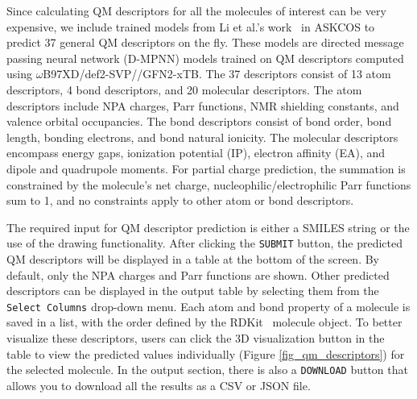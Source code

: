 \documentclass[pdflatex,sn-mathphys-num]{sn-jnl}%
\theoremstyle{thmstyleone}%
\theoremstyle{thmstyletwo}%
\theoremstyle{thmstylethree}%
\begin{document}
Since calculating QM descriptors for all the molecules of interest can be very expensive, we include trained models from Li et al.'s work~\citep{li_when_2024} in ASKCOS to predict 37 general QM descriptors on the fly. These models are directed message passing neural network (D-MPNN) models trained on QM descriptors computed using $\omega$B97XD/def2-SVP//GFN2-xTB. The 37 descriptors consist of 13 atom descriptors, 4 bond descriptors, and 20 molecular descriptors. The atom descriptors include NPA charges, Parr functions, NMR shielding constants, and valence orbital occupancies. The bond descriptors consist of bond order, bond length, bonding electrons, and bond natural ionicity. The molecular descriptors encompass energy gaps, ionization potential (IP), electron affinity (EA), and dipole and quadrupole moments. For partial charge prediction, the summation is constrained by the molecule's net charge, nucleophilic/electrophilic Parr functions sum to 1, and no constraints apply to other atom or bond descriptors.

The required input for QM descriptor prediction is either a SMILES string or the use of the drawing functionality. After clicking the \texttt{SUBMIT} button, the predicted QM descriptors will be displayed in a table at the bottom of the screen. By default, only the NPA charges and Parr functions are shown. Other predicted descriptors can be displayed in the output table by selecting them from the \texttt{Select Columns} drop-down menu. Each atom and bond property of a molecule is saved in a list, with the order defined by the RDKit~\citep{RDKit} molecule object. To better visualize these descriptors, users can click the 3D visualization button in the table to view the predicted values individually (Figure \ref{fig_qm_descriptors}) for the selected molecule. In the output section, there is also a \texttt{DOWNLOAD} button that allows you to download all the results as a CSV or JSON file.
\end{document}

